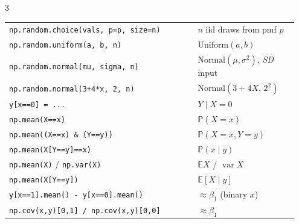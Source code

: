\documentclass[11pt]{article}
\newcommand{\E}{\mathbb{E}}
\newcommand{\Var}{\operatorname{var}}
\renewcommand{\P}{\mathbb{P}}
\newcommand{\given}{\mid}
\newcommand{\Unif}{\text{Uniform}}
\newcommand{\Norm}{\text{Normal}}
\newcommand{\py}[1]{\texttt{#1}}
\begin{document}
\begin{landscape}
\begin{multicols}{3}
\renewcommand{\arraystretch}{1.2}
\begin{tabular}{@{}p{0.62\linewidth}p{0.33\linewidth}@{}}
\py{np.random.choice(vals, p=p, size=n)} & $n$ iid draws from pmf $p$\\
\py{np.random.uniform(a, b, n)} & $\Unif(a,b)$\\
\py{np.random.normal(mu, sigma, n)} & $\Norm(\mu,\sigma^2)$, \emph{SD} input\\
\py{np.random.normal(3+4*x, 2, n)} & $\Norm(3+4X,\,2^2)$\\
\py{y[x==0] = ...} & $Y\given X{=}0$\\
\py{np.mean(X==x)} & $\P(X{=}x)$\\
\py{np.mean((X==x) \& (Y==y))} & $\P(X{=}x,Y{=}y)$\\
\py{np.mean(X[Y==y]==x)} & $\P(x\given y)$\\
\py{np.mean(X)} / \py{np.var(X)} & $\E X$ / $\Var X$\\
\py{np.mean(X[Y==y])} & $\E[X\given y]$\\
\py{y[x==1].mean() - y[x==0].mean()} & $\approx\beta_1$ (binary $x$)\\
\py{np.cov(x,y)[0,1] / np.cov(x,y)[0,0]} & $\approx\beta_1$\\
\end{tabular}

\end{multicols}
\endgroup
\end{landscape}
\restoregeometry
\end{document}
